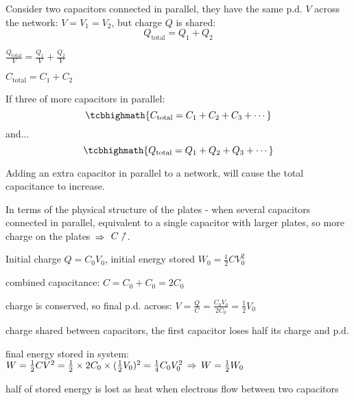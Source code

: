 Consider two capacitors connected in parallel, they have the same p.d. $V$ across the network: $V=V_1=V_2$, but charge $Q$ is shared: $$Q_\text{total} = Q_1 + Q_2$$

{

\centering

$\frac{Q_\text{total}}{V} = \frac{Q_1}{V} + \frac{Q_2}{V}$

$C_\text{total} = C_1 + C_2$

}


If three of more capacitors in parallel: $$\tcbhighmath{C_\text{total} = C_1 + C_2 + C_3 + \cdots}$$ and... $$\tcbhighmath{Q_\text{total} = Q_1 + Q_2 + Q_3 + \cdots}$$

Adding an extra capacitor in parallel to a network, will cause the total capacitance to increase.

In terms of the physical structure of the plates - when several capacitors connected in parallel, equivalent to a single capacitor with larger plates, so more charge on the plates $\, \Rightarrow \,$ $C\nnearrow$.


\begin{soln} Initial charge $Q=C_0 V_0$, initial energy stored $W_0 = \frac{1}{2} C V_0^2$

combined capacitance: $C= C_0 + C_0 = 2C_0$

charge is conserved, so final p.d. across: $V = \frac{Q}{C} = \frac{C_0 V_0}{2C_0} = \frac{1}{2} V_0$


charge shared between capacitors, the first capacitor loses half its charge and p.d.

final energy stored in system: $W = \frac{1}{2}CV^2 = \frac{1}{2} \times 2C_0 \times (\frac{1}{2}V_0)^2 = \frac{1}{4} C_0 V_0^2 \, \Rightarrow \, W = \frac{1}{2} W_0$

half of stored energy is lost as heat when electrons flow between two capacitors \end{soln}



\newpage

